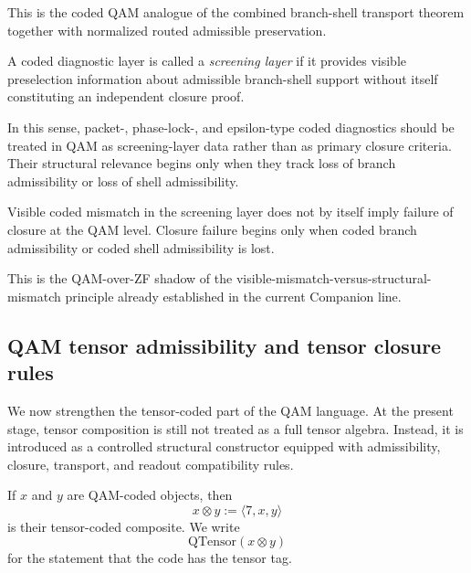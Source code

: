 \begin{remark}
This is the coded QAM analogue of the combined branch-shell transport theorem together with normalized routed admissible preservation.
\end{remark}

\begin{definition}
A coded diagnostic layer is called a \emph{screening layer} if it provides visible preselection information about admissible branch-shell support without itself constituting an independent closure proof.
\end{definition}

\begin{remark}
In this sense, packet-, phase-lock-, and epsilon-type coded diagnostics should be treated in QAM as screening-layer data rather than as primary closure criteria. Their structural relevance begins only when they track loss of branch admissibility or loss of shell admissibility.
\end{remark}

\begin{corollary}\label{cor:qam-visible-structural}
Visible coded mismatch in the screening layer does not by itself imply failure of closure at the QAM level. Closure failure begins only when coded branch admissibility or coded shell admissibility is lost.
\end{corollary}

\begin{remark}
This is the QAM-over-ZF shadow of the visible-mismatch-versus-structural-mismatch principle already established in the current Companion line.
\end{remark}


\subsection*{QAM tensor admissibility and tensor closure rules}

We now strengthen the tensor-coded part of the QAM language. At the present stage, tensor composition is still not treated as a full tensor algebra. Instead, it is introduced as a controlled structural constructor equipped with admissibility, closure, transport, and readout compatibility rules.

\begin{definition}
If $x$ and $y$ are QAM-coded objects, then
\[
x\otimes y := \langle 7,x,y\rangle
\]
is their tensor-coded composite. We write
\[
\mathrm{QTensor}(x\otimes y)
\]
for the statement that the code has the tensor tag.
\end{definition}

